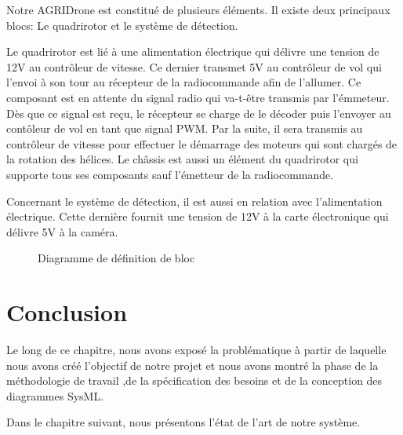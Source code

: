 				Notre AGRIDrone  est constitué de plusieurs éléments. Il existe deux principaux blocs: Le quadrirotor et le système de détection.
				
				Le quadrirotor est lié à une alimentation électrique qui  délivre une tension de 12V au contrôleur de vitesse. Ce dernier transmet 5V au contrôleur de vol qui l'envoi à son tour au récepteur de la radiocommande afin de l'allumer. Ce composant est en attente du signal radio qui va-t-être transmis par l'émmeteur. Dès que ce signal est reçu, le récepteur se charge de le décoder puis l'envoyer au contôleur de vol en tant que signal PWM. Par la suite, il sera transmis au contrôleur de vitesse pour effectuer le démarrage des moteurs qui sont chargés de la rotation des hélices. Le châssis est aussi un élément du quadrirotor qui supporte tous ses composants sauf l'émetteur de la radiocommande.
				
				Concernant le système de détection, il est aussi en relation avec l'alimentation électrique. Cette dernière fournit une tension de 12V à la carte électronique qui délivre 5V à la caméra.
				
					\begin{figure}[H] 
					\begin{center} 
						\centering
					\hspace*{-2.78cm}	
					\end{center}
					
					\caption{Diagramme de définition de bloc}
					
					\end {figure}
				
			   \section{Conclusion}
				Le long de ce chapitre, nous avons exposé la problématique à partir de laquelle nous avons créé l'objectif de notre projet et nous avons montré la phase de la méthodologie de travail ,de la spécification des besoins et de la conception des diagrammes SysML.
				
				Dans le chapitre suivant, nous présentons l'état de l'art de notre système.


	

